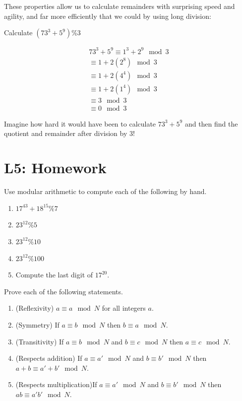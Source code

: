 These properties allow us to calculate remainders with surprising speed and agility, and far more efficiently that we could by using long division:

\begin{xca}
	Calculate $(73^3 + 5^9) \% 3$
	\end{xca}

\begin{solutions}
	\begin{align*}
		73^3 + 5^9 \equiv 1^3 + 2^9 \mod 3\\
		\equiv 1 + 2(2^8) \mod 3\\
		\equiv 1+2(4^4) \mod 3\\
		\equiv 1+2(1^4)\mod 3\\
		\equiv 3 \mod 3\\
		\equiv 0 \mod 3
		\end{align*}
	
Imagine how hard it would have been to calculate $73^3 + 5^9$ and then find the quotient and remainder after division by $3$!
	\end{solutions}


\section{L5: Homework}

\begin{xca}
		Use modular arithmetic to compute each of the following by hand.
	\begin{enumerate}
			\item $17^{43} + 18^{15} \% 7$
			\item $23^{12} \% 5$
			\item $23^{12} \% 10$
			\item $23^{12} \% 100$
			\item Compute the last digit of $17^{20}$.
		\end{enumerate}
	\end{xca}

\begin{xca}
		Prove each of the following statements.
		
		\begin{enumerate}
				\item (Reflexivity) $a \equiv a \mod N$ for all integers $a$.
				\item (Symmetry) If $a \equiv b \mod N$ then $b \equiv a \mod N$.
				\item (Transitivity) If $a \equiv b \mod N$ and $b \equiv c \mod N$ then $a \equiv c \mod N$.
				\item (Respects addition) If $a \equiv a' \mod N$ and $b \equiv b' \mod N$ then $a+b \equiv a'+b' \mod N$.
				\item (Respects multiplication)If $a \equiv a' \mod N$ and $b \equiv b' \mod N$ then $ab \equiv a'b' \mod N$.
			\end{enumerate}
	\end{xca}

